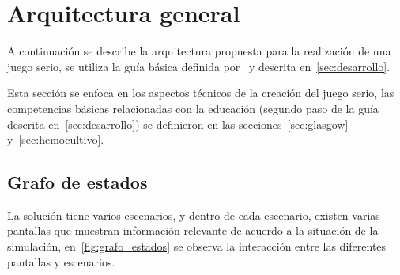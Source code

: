 
\section{Arquitectura general}
\label{sec:solucion}


A continuación se describe la arquitectura propuesta para la realización de una
juego serio, se utiliza la guía básica definida por~\cite{pereira2009design} y
descrita en~\ref{sec:desarrollo}.

Esta sección se enfoca en los aspectos técnicos de la creación del juego serio,
las competencias básicas relacionadas con la educación (segundo paso de la guía
descrita en~\ref{sec:desarrollo}) se definieron en las
secciones~\ref{sec:glasgow} y~\ref{sec:hemocultivo}.

\subsection{Grafo de estados}


La solución tiene varios escenarios, y dentro de cada escenario, existen varias
pantallas que muestran información relevante de acuerdo a la situación de la
simulación, en~\ref{fig:grafo_estados} se observa la interacción entre las
diferentes pantallas y escenarios.

